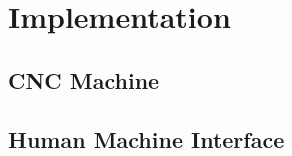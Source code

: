 \chapter{Implementation}
\label{ch:implementation}


\section{CNC Machine}




\section{Human Machine Interface}






